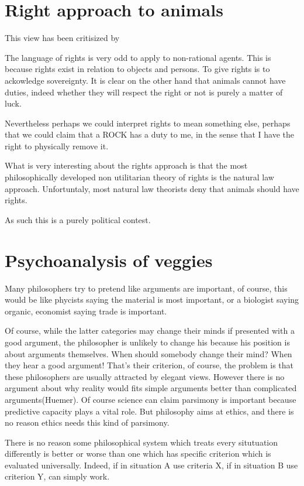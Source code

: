 
\section{Right approach to animals} 
This view has been critisized by \cite{Regan2020}

The language of rights is very odd to apply to non-rational agents. This is because rights exist in relation to objects and persons\cite{Midgley1983}. To give rights is to ackowledge sovereignty. It is clear on the other hand that animals cannot have duties, indeed whether they will respect the right or not is purely a matter of luck. 

Nevertheless perhaps we could interpret rights to mean something else, perhaps that we could claim that a ROCK has a duty to me, in the sense that I have the right to physically remove it. 

What is very interesting about the rights approach is that the most philosophically developed non utilitarian theory of rights is the natural law approach. Unfortuntaly, most natural law theorists deny that animals should have rights. 

As such this is a purely political contest. 

\section{Psychoanalysis of veggies}

Many philosophers try to pretend like arguments are important, of course, this would be like phycists saying the material is most important, or a biologist saying organic, economist saying trade is important. 

Of course, while the latter categories may change their minds if presented with a good argument, the philosopher is unlikely to change his because his position is about arguments themselves. When should somebody change their mind? When they hear a good argument! That's their criterion, of course, the problem is that these philosophers are usually attracted by elegant views. However there is no argument about why reality would fits simple arguments better than complicated arguments(Huemer). Of course science can claim parsimony is important because predictive capacity plays a vital role. But philosophy aims at ethics, and there is no reason ethics needs this kind of parsimony. 

There is no reason some philosophical system which treats every situtuation differently is better or worse than one which has specific criterion which is evaluated universally. Indeed, if in situation A use criteria X, if in situation B use criterion Y, can simply work. 


